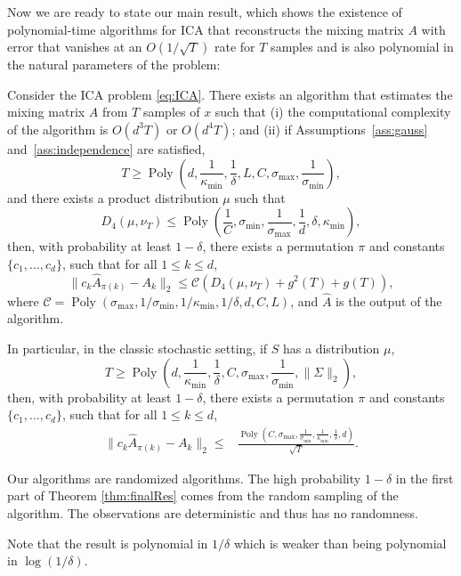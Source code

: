 \documentclass[twoside,11pt]{article}
\DeclareMathOperator{\pol}{Poly}
\newcommand{\poly}[1]{\pol\left(#1\right)}
\begin{document}
Now we are ready to state our main result, which shows the existence of polynomial-time algorithms for ICA that reconstructs the mixing matrix $A$ 
with error that vanishes at an $O(1/\sqrt{T})$ rate for $T$ samples and is also polynomial in the natural parameters of the problem:


\begin{theorem}
\label{thm:finalRes} Consider the ICA problem \eqref{eq:ICA}. There exists an algorithm that estimates the mixing matrix $A$ from $T$ samples of $x$ such that (i) the computational complexity of the algorithm is $O(d^3 T)$ or $O(d^4 T)$; and (ii) if Assumptions~\ref{ass:gauss} and~\ref{ass:independence} are satisfied,
\[
T \ge \poly{d, \frac{1}{\kappa_{\min}}, \frac{1}{\delta}, L, C, \sigma_{\max}, \frac{1}{\sigma_{\min}}},
\]
and there exists a product distribution  $\mu$  such that 
\[
D_4(\mu, \nu_T) \le \poly{\frac{1}{C},  \sigma_{\min},  \frac{1}{\sigma_{\max}},\frac{1}{d}, \delta, \kappa_{\min}},
\]
then, with probability at least $1-\delta$, there exists a permutation $\pi$ and constants $\{c_1,\ldots,c_d\}$, such that for all $1\le k\le d$,
\[
\| c_k\hat{A}_{\pi(k)} - A_k\|_2 \le \mathcal{C}\left(D_4(\mu, \nu_T)+g^2(T)+g(T)\right),
\]
where $\mathcal{C} = \poly{\sigma_{\max}, 1/\sigma_{\min}, 1/\kappa_{\min},1/\delta, d, C, L}$, and $\hat{A}$ is the output of the algorithm.

In particular, in the classic stochastic setting, if $S$ has a distribution $\mu$, 
\[
T \ge \poly{d, \frac{1}{\kappa_{\min}}, \frac{1}{\delta}, C, \sigma_{\max}, \frac{1}{\sigma_{\min}}, \|\Sigma\|_2},
\]
then, with probability at least $1-\delta$, there exists a permutation $\pi$ and constants $\{c_1,\ldots,c_d\}$, such that for all $1\le k\le d$,
\begin{align*}
 \| c_k\hat{A}_{\pi(k)} - A_k\|_2 \le 
& \frac{\poly{C, \sigma_{\max}, \frac{1}{\sigma_{\min}}, \frac{1}{\kappa_{\min}},\frac{1}{\delta}, d}}{\sqrt{T}}.
\end{align*}
\end{theorem}
\begin{remark}
Our algorithms are randomized algorithms. The high probability $1-\delta$ in the first part of Theorem \ref{thm:finalRes} comes from the random sampling of the algorithm. The observations are deterministic and thus has no randomness. 
\end{remark}
\begin{remark} %
Note that the result is polynomial in $1/\delta$ which is weaker than being polynomial in $\log(1/\delta)$.
\end{remark}
\end{document}
